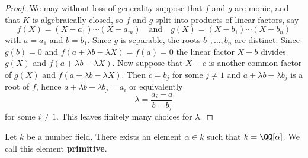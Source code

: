 \documentclass[12pt, a4paper]{article}
\begin{document}
\begin{proof}
    We may without loss of generality suppose that \( f \) and \( g \) are monic, and that \( K \) is algebraically closed, so \( f \) and \( g \) split into products of linear factors, say
    \[ f(X) = (X - a_1) \cdots (X - a_m) \quad \text{and} \quad g(X) = (X - b_1) \cdots (X - b_n) \]
    with \( a = a_1 \) and \( b = b_1 \). Since \( g \) is separable, the roots \( b_1, \ldots, b_n \) are distinct. Since \( g(b) = 0 \) and \( f(a + \lambda b - \lambda X) = f(a) = 0 \) the linear factor \( X - b \) divides \( g(X) \) and \( f(a + \lambda b - \lambda X) \). Now suppose that \( X - c \) is another common factor of \( g(X) \) and \( f(a + \lambda b - \lambda X) \). Then \( c = b_j \) for some \( j \neq 1 \) and \( a + \lambda b - \lambda b_j \) is a root of \( f \), hence \( a + \lambda b - \lambda b_j = a_i \) or equivalently
    \[ \lambda = \frac{a_i - a}{b - b_j} \]
    for some \( i \neq 1 \). This leaves finitely many choices for \( \lambda \). 
\end{proof}

\begin{mdthm}
    Let \(k\) be a number field. There exists an element \(\alpha\in k\) such that \(k=\QQ[\alpha]\). We call this element \textbf{primitive}.
\end{mdthm}
\end{document}
